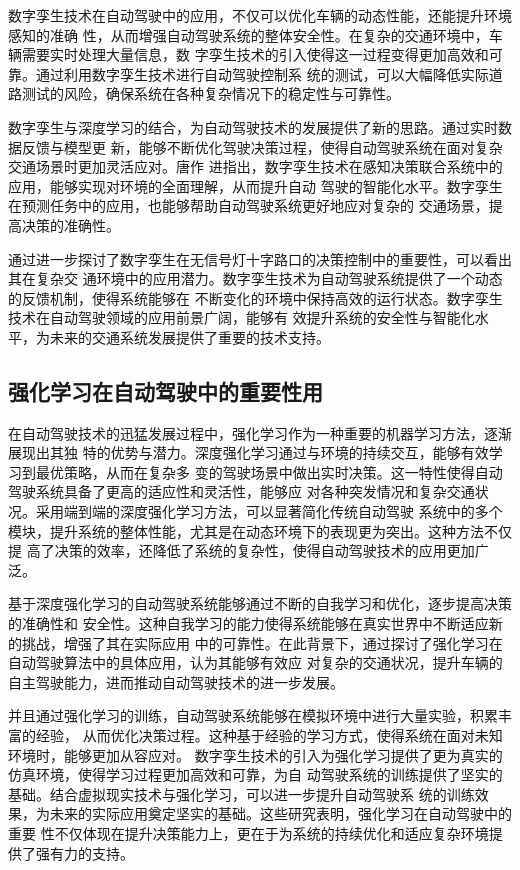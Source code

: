 数字孪生技术在自动驾驶中的应用，不仅可以优化车辆的动态性能，还能提升环境感知的准确
性，从而增强自动驾驶系统的整体安全性。在复杂的交通环境中，车辆需要实时处理大量信息，数
字孪生技术的引入使得这一过程变得更加高效和可靠。通过利用数字孪生技术进行自动驾驶控制系
统的测试，可以大幅降低实际道路测试的风险，确保系统在各种复杂情况下的稳定性与可靠性。

数字孪生与深度学习的结合，为自动驾驶技术的发展提供了新的思路。通过实时数据反馈与模型更
新，能够不断优化驾驶决策过程，使得自动驾驶系统在面对复杂交通场景时更加灵活应对。唐作
进指出，数字孪生技术在感知决策联合系统中的应用，能够实现对环境的全面理解，从而提升自动
驾驶的智能化水平。数字孪生在预测任务中的应用，也能够帮助自动驾驶系统更好地应对复杂的
交通场景，提高决策的准确性。

通过进一步探讨了数字孪生在无信号灯十字路口的决策控制中的重要性，可以看出其在复杂交
通环境中的应用潜力。数字孪生技术为自动驾驶系统提供了一个动态的反馈机制，使得系统能够在
不断变化的环境中保持高效的运行状态。数字孪生技术在自动驾驶领域的应用前景广阔，能够有
效提升系统的安全性与智能化水平，为未来的交通系统发展提供了重要的技术支持。

\subsection{强化学习在自动驾驶中的重要性用}

在自动驾驶技术的迅猛发展过程中，强化学习作为一种重要的机器学习方法，逐渐展现出其独
特的优势与潜力。深度强化学习通过与环境的持续交互，能够有效学习到最优策略，从而在复杂多
变的驾驶场景中做出实时决策。这一特性使得自动驾驶系统具备了更高的适应性和灵活性，能够应
对各种突发情况和复杂交通状况。采用端到端的深度强化学习方法，可以显著简化传统自动驾驶
系统中的多个模块，提升系统的整体性能，尤其是在动态环境下的表现更为突出。这种方法不仅提
高了决策的效率，还降低了系统的复杂性，使得自动驾驶技术的应用更加广泛。

基于深度强化学习的自动驾驶系统能够通过不断的自我学习和优化，逐步提高决策的准确性和
安全性。这种自我学习的能力使得系统能够在真实世界中不断适应新的挑战，增强了其在实际应用
中的可靠性。在此背景下，通过探讨了强化学习在自动驾驶算法中的具体应用，认为其能够有效应
对复杂的交通状况，提升车辆的自主驾驶能力，进而推动自动驾驶技术的进一步发展。

并且通过强化学习的训练，自动驾驶系统能够在模拟环境中进行大量实验，积累丰富的经验，
从而优化决策过程。这种基于经验的学习方式，使得系统在面对未知环境时，能够更加从容应对。
数字孪生技术的引入为强化学习提供了更为真实的仿真环境，使得学习过程更加高效和可靠，为自
动驾驶系统的训练提供了坚实的基础。结合虚拟现实技术与强化学习，可以进一步提升自动驾驶系
统的训练效果，为未来的实际应用奠定坚实的基础。这些研究表明，强化学习在自动驾驶中的重要
性不仅体现在提升决策能力上，更在于为系统的持续优化和适应复杂环境提供了强有力的支持。

